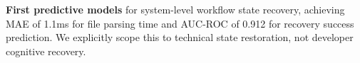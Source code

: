     \item \textbf{First predictive models} for system-level workflow state recovery, achieving MAE of 1.1ms for file parsing time and AUC-ROC of 0.912 for recovery success prediction. We explicitly scope this to technical state restoration, not developer cognitive recovery.
